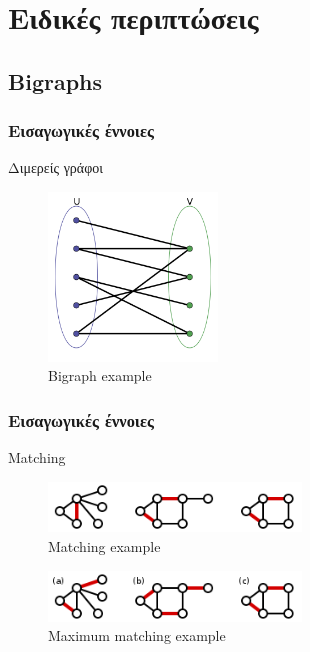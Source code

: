 \documentclass[greek]{beamer}
\begin{document}
\section{Ειδικές περιπτώσεις}


\subsection{Bigraphs}


\begin{frame}
\frametitle{Εισαγωγικές έννοιες}
Διμερείς γράφοι\\
\begin{figure}[H]
\caption{Bigraph example}
\centering
\includegraphics[width=0.4\textwidth]{Figures/bigraph.png}\centering
\end{figure}
\end{frame}


\begin{frame}
\frametitle{Εισαγωγικές έννοιες}
Matching\\
\begin{figure}[H]
\caption{Matching example}
\centering
\includegraphics[width=0.6\textwidth]{Figures/match.png}\centering
\end{figure}

\begin{figure}[H]
\caption{Maximum matching example}
\centering
\includegraphics[width=0.6\textwidth]{Figures/max_match.png}\centering
\end{figure}
\end{frame}
\end{document}
